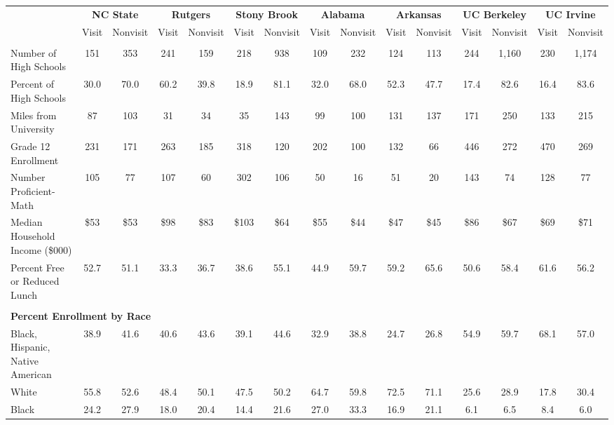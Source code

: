 \begin{tabular*}{\linewidth}{@{\extracolsep{\fill} } lcccccccccccccc}%
&\multicolumn{2}{c}{\bfseries NC State}&\multicolumn{2}{c}{\bfseries Rutgers}&\multicolumn{2}{c}{\bfseries Stony Brook}&\multicolumn{2}{c}{\bfseries Alabama}&\multicolumn{2}{c}{\bfseries Arkansas}&\multicolumn{2}{c}{\bfseries UC Berkeley}&\multicolumn{2}{c}{\bfseries UC Irvine}\\%
&Visit&\multicolumn{1}{l}{Nonvisit}&Visit&\multicolumn{1}{l}{Nonvisit}&Visit&\multicolumn{1}{l}{Nonvisit}&Visit&\multicolumn{1}{l}{Nonvisit}&Visit&\multicolumn{1}{l}{Nonvisit}&Visit&\multicolumn{1}{l}{Nonvisit}&Visit&\multicolumn{1}{l}{Nonvisit}\\%
\hline%
&&&&&&&&&&&&&&\\%
\hspace{0cm}Number of High Schools&151&353&241&159&218&938&109&232&124&113&244&1,160&230&1,174\\%
Percent of High Schools&30.0&70.0&60.2&39.8&18.9&81.1&32.0&68.0&52.3&47.7&17.4&82.6&16.4&83.6\\%
\hspace{0cm}Miles from University&87&103&31&34&35&143&99&100&131&137&171&250&133&215\\%
\hspace{0cm}Grade 12 Enrollment&231&171&263&185&318&120&202&100&132&66&446&272&470&269\\%
\hspace{0cm}Number Proficient{-}Math&105&77&107&60&302&106&50&16&51&20&143&74&128&77\\%
\hspace{0cm}Median Household Income (\$000)&\$53&\$53&\$98&\$83&\$103&\$64&\$55&\$44&\$47&\$45&\$86&\$67&\$69&\$71\\%
\hspace{0cm}Percent Free or Reduced Lunch&52.7&51.1&33.3&36.7&38.6&55.1&44.9&59.7&59.2&65.6&50.6&58.4&61.6&56.2\\%
&&&&&&&&&&&&&&\\%
\multicolumn{15}{l}{\bfseries Percent Enrollment by Race}\\%
\hspace{0.2cm}Black, Hispanic, Native American&38.9&41.6&40.6&43.6&39.1&44.6&32.9&38.8&24.7&26.8&54.9&59.7&68.1&57.0\\%
\hspace{0.2cm}White&55.8&52.6&48.4&50.1&47.5&50.2&64.7&59.8&72.5&71.1&25.6&28.9&17.8&30.4\\%
\hspace{0.2cm}Black&24.2&27.9&18.0&20.4&14.4&21.6&27.0&33.3&16.9&21.1&6.1&6.5&8.4&6.0\\%

\end{tabular*}

